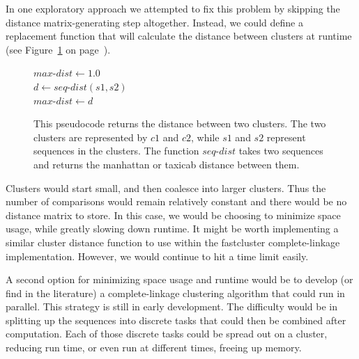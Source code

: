 In one exploratory approach we attempted to fix this problem by skipping the distance matrix-generating step altogether.
Instead, we could define a replacement function that will calculate the distance between clusters at runtime (see Figure~\ref{code:LazyClustering} on page~\pageref{code:LazyClustering}).
\begin{figure}[h!]
\begin{algorithm}[H]
 \SetAlgoLined

\BlankLine
 $max$-$dist \gets 1.0$\\
  {
    {
    $d \gets seq$-$dist(s1, s2)$\\
     {
      $max$-$dist \gets d$
    }
   }
 }
\end{algorithm}
\caption[Pseudocode showing a distance function for two clusters.]{This pseudocode returns the distance between two clusters. The two clusters are represented by $c1$ and $c2$, while $s1$ and $s2$ represent sequences in the clusters. The function $seq$-$dist$ takes two sequences and returns the manhattan or taxicab distance between them.}
\label{code:LazyClustering}
\end{figure}
Clusters would start small, and then coalesce into larger clusters.
Thus the number of comparisons would remain relatively constant and there would be no distance matrix to store.
In this case, we would be choosing to minimize space usage, while greatly slowing down runtime.
It might be worth implementing a similar cluster distance function to use within the fastcluster complete-linkage implementation.
However, we would continue to hit a time limit easily.

A second option for minimizing space usage and runtime would be to develop (or find in the literature) a complete-linkage clustering algorithm that could run in parallel.
This strategy is still in early development.
The difficulty would be in splitting up the sequences into discrete tasks that could then be combined after computation.
Each of those discrete tasks could be spread out on a cluster, reducing run time, or even run at different times, freeing up memory.

